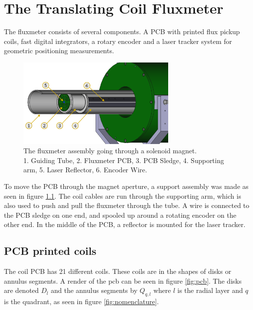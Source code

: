 \chapter{The Translating Coil Fluxmeter}
The fluxmeter consists of several components. A PCB with
printed flux pickup coils, fast digital integrators, a rotary
encoder and a laser tracker system for geometric positioning measurements.

\begin{figure}[!h]
    \centering
    \includegraphics[width=0.7\textwidth]{figs/elena}
    \caption{The fluxmeter assembly going through a solenoid magnet. \\
        1. Guiding Tube, 2. Fluxmeter PCB, 3. PCB Sledge, 4. Supporting arm,
        5. Laser Reflector, 6. Encoder Wire.}
    \label{fig:elena}
\end{figure}

To move the PCB through the magnet aperture, a support assembly was made as
seen in figure \ref{fig:elena}. The coil cables are run through the supporting
arm, which is also used to push and pull the fluxmeter through the tube. A
wire is connected to the PCB sledge on one end, and spooled up around
a rotating encoder on the other end. In the middle of the PCB, a
reflector is mounted for the laser tracker.

\section{PCB printed coils}
The coil PCB has 21 different coils.
These coils are in the shapes of disks or annulus segments.
A render of the pcb can be seen in figure
\ref{fig:pcb}. The disks are denoted $D_l$ and the
annulus segments by $Q_{q, l}$ where $l$ is the radial layer and
$q$ is the quadrant, as seen in figure \ref{fig:nomenclature}.

